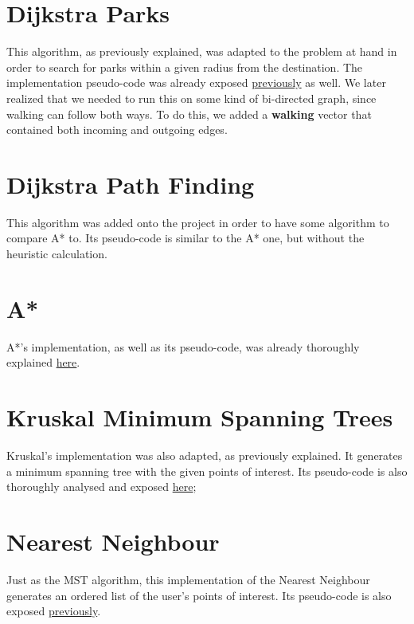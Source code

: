 \documentclass[a4paper, 12pt]{report}
\begin{document}
    \section{Dijkstra Parks}
    
    This algorithm, as previously explained, was adapted to the problem at hand in order to search for parks within a given radius from the destination. The implementation pseudo-code was already exposed \hyperref[alg:dijkstra]{previously} as well.
    We later realized that we needed to run this on some kind of bi-directed graph, since walking can follow both ways. To do this, we added a \textbf{walking} vector that contained both incoming and outgoing edges.
    
    \section{Dijkstra Path Finding}
    
    This algorithm was added onto the project in order to have some algorithm to compare A* to. Its pseudo-code is similar to the A* one, but without the heuristic calculation.
    
    
    \section{A*}
    
    A*'s implementation, as well as its pseudo-code, was already thoroughly explained \hyperref[alg:astar]{here}.
    
    \section{Kruskal Minimum Spanning Trees}
    
    Kruskal's implementation was also adapted, as previously explained. It generates a minimum spanning tree with the given points of interest. Its pseudo-code is also thoroughly analysed and exposed \hyperref[alg:mst]{here};
    
    \section{Nearest Neighbour}
    
    Just as the MST algorithm, this implementation of the Nearest Neighbour generates an ordered list of the user's points of interest. Its pseudo-code is also exposed \hyperref[alg:nearest]{previously}.
    
\end{document}
